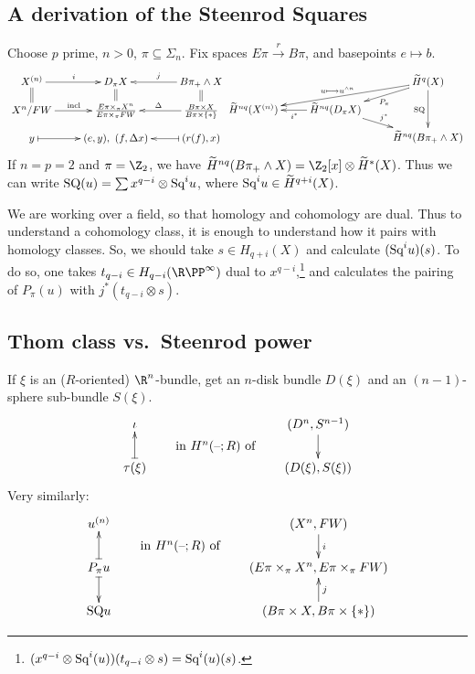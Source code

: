 \documentclass[11pt]{article}
\newcommand{\KanSemResponse}[1]
{
\thispagestyle{fancy}
\section{#1}
}
\begin{document}
\begin{SteenrodTalk}
\KanSemResponse
{A derivation of the Steenrod Squares}
Choose $p$ prime, $n>0$, $\pi\subseteq \Sigma_n$. Fix spaces $E\pi\overset{r}{\to} B\pi$, and basepoints $e\mapsto b$.
\[\xymatrix@R=.3cm{
X^{(n)}\ar[r]^i\ar@{=}[d]&D_\pi X\ar@{=}[d]&\ar[l]_jB\pi_+\wedge X\ar@{=}[d]\\
X^n/FW\ar[r]^{\text{incl}} &\frac{E\pi\times_\pi X^n}{E\pi\times_\pi FW}&
\ar[l]_\Delta\frac{B\pi\times X}{B\pi\times\{*\}}\\
y\ar@{|->}[r]&(e,y),\ (f,\Delta x)&\ar@{|->}[l](r(f),x)
}
\xymatrix@R=.3cm{
&&\widetilde H^q(X)\ar[lld]_{u\mapsto u^{\wedge n}}\ar[ld]^{P_\pi}
\ar[dd]_{\text{SQ}}\\
\widetilde H^{nq}(X^{(n)})&\ar[l]^{i^*}\widetilde H^{nq}(D_\pi X)
\ar[rd]^{j^*}\\
&&\widetilde H^{nq}(B\pi_+\wedge X)
}
\]
If $n=p=2$ and $\pi=\Z_2$, we have $\widetilde H^{nq}(B\pi_+\wedge X)=\Z_2[x]\otimes \widetilde H^*(X)$. Thus we can write $\text{SQ}(u)=\sum x^{q-i}\otimes\textup{Sq}^iu$, where $\textup{Sq}^iu\in \widetilde H^{q+i}(X)$.

We are working over a field, so that homology and cohomology are dual. Thus to understand a cohomology class, it is enough to understand how it pairs with homology classes. So, we should take $s\in H_{q+i}(X)$ and calculate $(\textup{Sq}^iu)(s)$. To do so, one takes $t_{q-i}\in H_{q-i}(\RP^\infty)$ dual to $x^{q-i}$,\footnote{$(x^{q-i}\otimes \textup{Sq}^i(u))(t_{q-i}\otimes s)=\textup{Sq}^i(u)(s)$.}
and calculates the pairing of $P_\pi(u)$ with $j^*(t_{q-i}\otimes s)$.

\subsection*{Thom class vs.\ Steenrod power}
If $\xi$ is an ($R$-oriented) $\R^n$-bundle, get an $n$-disk bundle $D(\xi)$ and an $(n-1)$-sphere sub-bundle $S(\xi)$.
\[\xymatrix@!0@R=12mm@C=2.5cm{
\iota\\
\tau(\xi)\ar@{|->}[u]
}
\raisebox{-.6cm}{\qquad in $H^n(\DASH;R)$ of\qquad}
\xymatrix@!0@R=12mm@C=2.5cm{
(D^n,S^{n-1})\ar[d]\\
(D(\xi),S(\xi))
}\]
Very similarly:
\[\xymatrix@!0@R=12mm@C=2.5cm{
u^{(n)}\\
P_\pi u\ar@{|->}[u]\ar@{|->}[d]\\
\text{SQ}u
}
\raisebox{-.6cm}{\qquad in $H^n(\DASH;R)$ of\qquad}
\xymatrix@!0@R=12mm@C=2.5cm{
(X^n,FW)\ar[d]^i\\
(E\pi\times_\pi X^n,E\pi\times_\pi FW)\\
(B\pi\times X,B\pi\times\{*\})\ar[u]_j
}\]


\end{SteenrodTalk}
\end{document}
